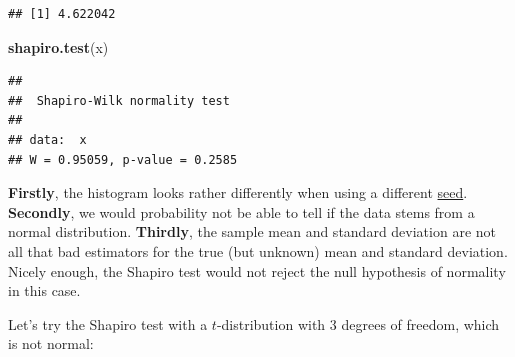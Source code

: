 \documentclass[
]{book}
\newenvironment{Shaded}{\begin{snugshade}}{\end{snugshade}}
\newcommand{\FunctionTok}[1]{\textcolor[rgb]{0.13,0.29,0.53}{\textbf{#1}}}
\newcommand{\NormalTok}[1]{#1}
\begin{document}
\begin{verbatim}
## [1] 4.622042
\end{verbatim}

\begin{Shaded}
\begin{Highlighting}[]
\FunctionTok{shapiro.test}\NormalTok{(x)}
\end{Highlighting}
\end{Shaded}

\begin{verbatim}
## 
##  Shapiro-Wilk normality test
## 
## data:  x
## W = 0.95059, p-value = 0.2585
\end{verbatim}

\textbf{Firstly}, the histogram looks rather differently when using a different \href{https://r-coder.com/set-seed-r/}{seed}.
\textbf{Secondly}, we would probability
not be able to tell if the data stems from a normal distribution.
\textbf{Thirdly}, the sample mean and standard deviation
are not all that bad estimators for the true (but unknown) mean and standard deviation. Nicely enough,
the Shapiro test would not reject the null hypothesis of normality in this case.

Let's try the Shapiro test with a \(t\)-distribution with 3 degrees of freedom, which is not normal:
\end{document}
